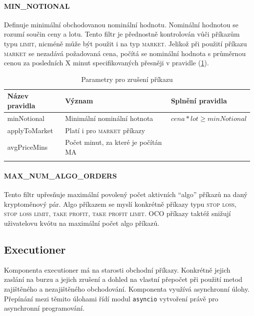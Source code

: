 \paragraph*{MIN\_NOTIONAL}
Definuje minimální obchodovanou nominální hodnotu. Nominální hodnotou se rozumí součin ceny a lotu. Tento filtr je přednostně kontrolován vůči příkazům typu \textsc{limit}, nicméně
může být použit i na typ \textsc{market}. Jelikož při použití příkazu \textsc{market} se nezadává požadovaná cena, počítá se nominální hodnota s průměrnou cenou za posledních X minut
specifikovaných přesněji v pravidle (\ref{tab:binance:notional_filter}).
\begin{center}
    \begin{longtable}[h]{|l|l|l|}
        \hline
        Název pravidla & Význam                              & Splnění pravidla                \\
        \hline
        minNotional    & Minimální nominální hotnota         & $ cena * lot \geq minNotional $ \\ 
        \hline
        applyToMarket  & Platí i pro \textsc{market} příkazy &                                 \\ 
        \hline
        avgPriceMins   & Počet minut, za které je počítán MA &                                 \\ 
        \hline
        \caption{Parametry pro zrušení příkazu}
        \label{tab:binance:notional_filter}
    \end{longtable}
\end{center}

\paragraph*{MAX\_NUM\_ALGO\_ORDERS}
Tento filtr upřesňuje maximální povolený počet aktivních \enquote{algo} příkazů na daný kryptoměnový pár. Algo příkazem se myslí konkrétně příkazy typu
\textsc{stop loss, stop loss limit, take profit, take profit limit}. OCO příkazy taktéž snižují uživatelovu kvótu na maximální počet algo příkazů. 

\subsection{Executioner}
Komponenta executioner má na starosti obchodní příkazy. Konkrétně jejich zaslání na burzu a jejich zrušení a dohled na vlastní přepočet při použití metod zajištěného a nezajištěného obchodování. Komponenta
využívá asynchronní úlohy. Přepínání mezi těmito úlohami řídí modul \verb|asyncio| vytvoření právě pro asynchronní programování.

